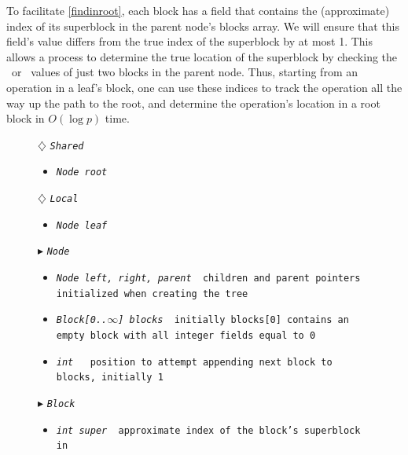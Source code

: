 To facilitate \ref{findinroot}, each block has a field  that contains
the (approximate) index of its superblock in the parent node's blocks array.
We will ensure that this field's value differs from the true index of the superblock by at most 1.
This allows a process to determine the true location of the superblock by checking the \eleft\ or \eright\ values of just two blocks in the parent node.
Thus, starting from an operation in a leaf's block, one can use these indices to track the 
operation all the way up the path to the root, and determine the operation's location in a root block
in $O(\log p)$ time.




\begin{figure}
\begin{algorithmic}[1]
\setcounter{ALG@line}{1}


\Statex $\diamondsuit$ \tt{\sl{Shared}}
\begin{itemize}
\item \tt{\sl{Node} root} 
\end{itemize}

\Statex $\diamondsuit$ \tt{\sl{Local}}
\begin{itemize}
\item \tt{\sl{Node} leaf} 
\end{itemize}

\Statex $\blacktriangleright$ \tt{\sl{Node}}
\begin{itemize}
\item \tt{\sl{Node} left, right, parent} \textsf{\com\ children and parent pointers initialized  when creating the tree}
\item \tt{\sl{Block[0..$\infty$]} blocks} \textsf{\com\ initially \tt{blocks[0]} contains an empty block with all integer fields equal to 0}
\item \tt{\sl{int} \head} \textsf{\com\ position to attempt appending next \tt{block} to \tt{blocks}, initially 1}
\end{itemize}

\Statex $\blacktriangleright$ \tt{\sl{Block}} 

\begin{itemize}
  \item \tt{\sl{int} super}
  \textsf{\com\ approximate index of the block's superblock in }
\end{itemize}




\end{algorithmic}
\end{figure}
